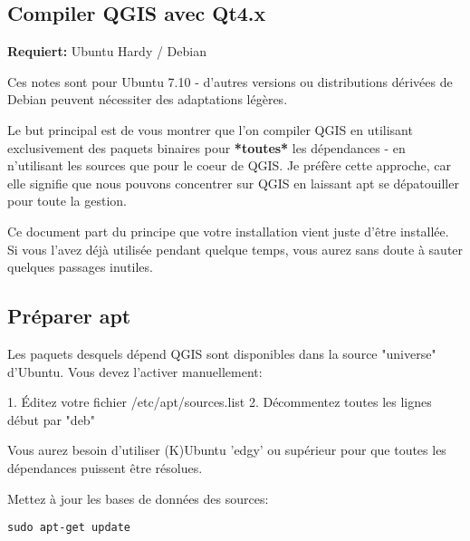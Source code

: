 \subsection{Compiler QGIS avec Qt4.x}
\textbf{Requiert:} Ubuntu Hardy / Debian

Ces notes sont pour Ubuntu 7.10 - d'autres versions ou distributions dérivées de Debian peuvent nécessiter des adaptations légères.

Le but principal est de vous montrer que l'on compiler QGIS en utilisant exclusivement des paquets binaires pour \textbf{*toutes*} les dépendances - en n'utilisant les sources que pour le coeur de QGIS. Je préfère cette approche, car elle signifie que nous pouvons concentrer sur QGIS en laissant apt se dépatouiller pour toute la gestion.

Ce document part du principe que votre installation vient juste d'être installée. Si vous l'avez déjà utilisée pendant quelque temps, vous aurez sans doute à sauter quelques passages inutiles.

% 
% 
% 
% 

\subsection{Préparer apt}
Les paquets desquels dépend QGIS sont disponibles dans la source "universe" d'Ubuntu. Vous devez l'activer manuellement:

1. Éditez votre fichier /etc/apt/sources.list   
2. Décommentez toutes les lignes début par "deb"

Vous aurez besoin d'utiliser (K)Ubuntu 'edgy' ou supérieur pour que toutes les dépendances puissent être résolues.

Mettez à jour les bases de données des sources:

\begin{verbatim}
sudo apt-get update 
\end{verbatim}

